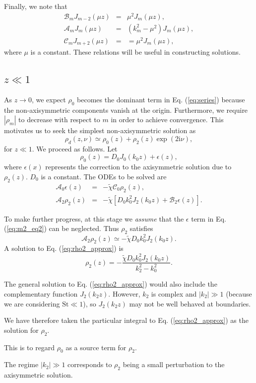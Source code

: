 \documentclass[apj]{emulateapj}
\newcommand{\Eq}[1]{Eq. (\ref{#1})}
\newcommand{\eq}[1]{\Eq{#1}}
\newcommand{\beq}{\begin{equation}}
\newcommand{\eeq}{\end{equation}}
\newcommand{\beqn}{\begin{eqnarray}}
\newcommand{\eeqn}{\end{eqnarray}}
\begin{document}
Finally, we note that
\beqn\label{eq:ops2}
\mathcal{B}_mJ_{m-2}(\mu z) &=& \mu^2J_m(\mu z),\\
\mathcal{A}_mJ_m(\mu z) &=& \left(k_m^2 - \mu^2\right)J_m(\mu z),\\
\mathcal{C}_mJ_{m+2}(\mu z) &= & = \mu^2J_m(\mu z),
\eeqn
where $\mu$ is a constant. These relations will be useful in
constructing solutions. 

\subsection{$z\ll 1$}
As $z\to 0$, we expect $\rho_0$ becomes the dominant term
in \eq{eq:series} because the non-axisymmetric components vanish at the origin. 
Furthermore, we require $|\rho_m|$ to decrease with respect to $m$ in order to achieve convergence. 
This motivates us to seek the simplest non-axisymmetric solution as  
\beq
\rho_d(z,\nu) \simeq \rho_0(z) + \rho_2(z)\exp{\left(2\mathrm{i}\nu\right)},  
\eeq
for $z\ll 1$. We proceed as follows. Let
\beq
\rho_0(z) = D_0J_0(k_0z) + \epsilon(z),  
\eeq
where $\epsilon(x)$ represents the correction to the axisymmetric
solution due to $\rho_2(z)$. $D_0$ is a constant. The ODEs to be
solved are 
\beqn
\mathcal{A}_0\epsilon(z) &=& -\tilde{\chi}\mathcal{C}_0\rho_2(z),\label{eq:m2_eq1}\\
\mathcal{A}_2\rho_2(z) &=& -\tilde{\chi}\left[D_0k_0^2J_2(k_0z) +
  \mathcal{B}_2\epsilon(z)\right].\label{eq:m2_eq2} 
\eeqn

To make further progress, at this stage we \emph{assume} that the
$\epsilon$ term in \eq{eq:m2_eq2} can be neglected. Thus $\rho_2$ satisfies
\beq\label{eq:rho2_approx}
\mathcal{A}_2\rho_2(z) \simeq -\tilde{\chi}D_0k_0^2J_2(k_0z).
\eeq
A solution to \eq{eq:rho2_approx} is
\beq\label{eq:rho2_approx_sol}
\rho_2(z)  = -\frac{\tilde{\chi}D_0k_0^2J_2(k_0z)}{k_2^2 - k_0^2}. 
\eeq

The general solution to \eq{eq:rho2_approx} would also include the
complementary function $J_2(k_2z)$. However, $k_2$ is complex and $|k_2|\gg 1$ (because we are considering
$\mathrm{St}\ll1$), so $J_2(k_2z)$
may not be well behaved at boundaries. 


We have therefore taken the
particular integral to \eq{eq:rho2_approx} as the solution for
$\rho_2$. 

This is to regard $\rho_0$ as a source term for
$\rho_2$. 

The regime $|k_2|\gg1$ corresponds to  
$\rho_2$ being a small perturbation to the
axisymmetric solution. 
\end{document}
